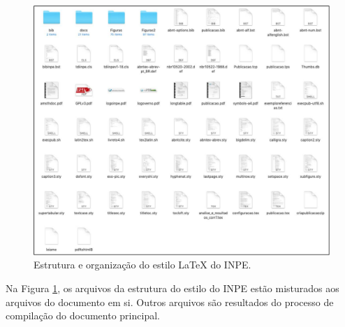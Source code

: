 
\begin{figure}[H]
\caption{Estrutura e organização do estilo \LaTeX{} do INPE.}
\vspace{6mm}
    \begin{center}
        \includegraphics[scale=0.3]{./docs/figs/estrutura_estilo_inpe.pdf}
    \end{center}
\vspace{4mm}
\label{fig:estrut}
\end{figure}

Na Figura \ref{fig:estrut}, os arquivos da estrutura do estilo do INPE estão misturados aos arquivos do documento em si. Outros arquivos são resultados do processo de compilação do documento principal. 

